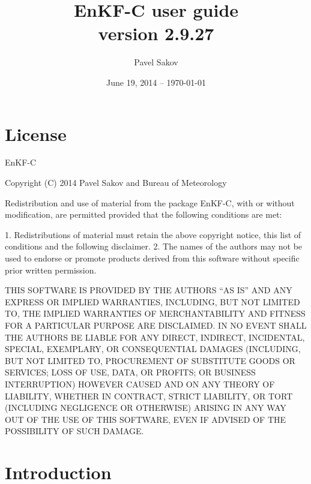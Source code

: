\documentclass[11pt]{report}
\begin{document}
\title{EnKF-C user guide\\{\normalsize version 2.9.27}}

\author{Pavel Sakov}
\date{June 19, 2014 -- \today}

\maketitle
\thispagestyle{empty}

\clearpage

\tableofcontents

\clearpage

\chapter*{License}

EnKF-C

Copyright (C) 2014 Pavel Sakov and Bureau of Meteorology

Redistribution and use of material from the package EnKF-C, with or without
modification, are permitted provided that the following conditions are 
met:

   1. Redistributions of material must retain the above copyright notice, this
      list of conditions and the following disclaimer.
   2. The names of the authors may not be used to endorse or promote products
      derived from this software without specific prior written permission.

THIS SOFTWARE IS PROVIDED BY THE AUTHORS ``AS IS'' AND ANY EXPRESS OR IMPLIED 
WARRANTIES, INCLUDING, BUT NOT LIMITED TO, THE IMPLIED WARRANTIES OF
MERCHANTABILITY AND FITNESS FOR A PARTICULAR PURPOSE ARE DISCLAIMED. IN NO
EVENT SHALL THE AUTHORS BE LIABLE FOR ANY DIRECT, INDIRECT, INCIDENTAL, SPECIAL,
EXEMPLARY, OR CONSEQUENTIAL DAMAGES (INCLUDING, BUT NOT LIMITED TO, PROCUREMENT
OF SUBSTITUTE GOODS OR SERVICES; LOSS OF USE, DATA, OR PROFITS; OR BUSINESS
INTERRUPTION) HOWEVER CAUSED AND ON ANY THEORY OF LIABILITY, WHETHER IN
CONTRACT, STRICT LIABILITY, OR TORT (INCLUDING NEGLIGENCE OR OTHERWISE) ARISING
IN ANY WAY OUT OF THE USE OF THIS SOFTWARE, EVEN IF ADVISED OF THE POSSIBILITY
OF SUCH DAMAGE.

\chapter*{Introduction}
\end{document}
